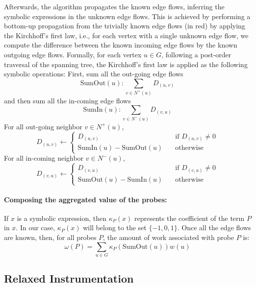Afterwards, the algorithm propagates the known edge flows, inferring
the symbolic expressions in the unknown edge flows.
This is achieved by performing a bottom-up propagation from the trivially known
edge flows (in red) by applying the Kirchhoff's first law, i.e.,
for each vertex with a single unknown edge flow, we compute the difference between
the known incoming edge flows by the known outgoing edge flows.
Formally,
for each vertex $u\in G$, following a post-order traversal of the spanning tree,
the Kirchhoff's first law is applied as the following symbolic operations:
First, sum all the out-going edge flows
\[
\mathrm{SumOut}(u): \sum_{v\in N^+(u)} D_{(u,v)}
\]
and then sum all the in-coming edge flows
\[
\mathrm{SumIn}(u): \sum_{v\in N^-(u)} D_{(v,u)}
\]
For all out-going neighbor $v\in N^+(u)$,
\[
D_{(u,v)} \gets
\begin{cases}
    D_{(u,v)} & \!\!\!\quad \text{if $D_{(u,v)}\neq 0$}\\
    \mathrm{SumIn}(u) - \mathrm{SumOut}(u)       & \!\!\!\quad \text{otherwise}
\end{cases}
\]
For all in-coming neighbor $v\in N^-(u)$,
\[
D_{(v,u)} \gets
\begin{cases}
    D_{(v,u)} & \!\!\!\quad \text{if $D_{(v,u)}\neq 0$}\\
    \mathrm{SumOut}(u) - \mathrm{SumIn}(u)       & \!\!\!\quad \text{otherwise}
\end{cases}
\]

\paragraph{Composing the aggregated value of the probes:}
If $x$ is a symbolic expression, then $\kappa_P(x)$ represents the coefficient
of the term $P$ in $x$.
In our case, $\kappa_P(x)$ will belong to the set $\{-1,0,1\}$.
Once all the edge flows are known, then, 
for all probes $P$, the amount of work associated
with probe $P$ is:
\[
\omega(P) = \sum_{u\in G} \kappa_P(\mathrm{SumOut}(u))w(u)
\]

\subsection{Relaxed Instrumentation}

